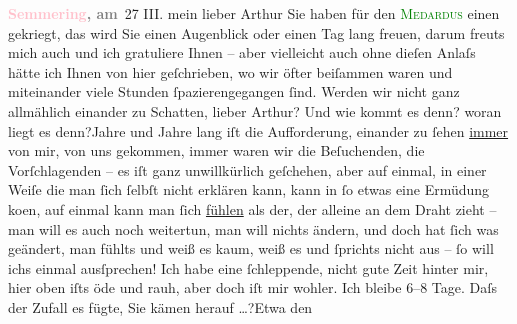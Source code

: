            \pstart
           \noindent{}\raggedleft{}\textcolor{gray}{\textbf{\textcolor{pink}{Semmering}{}\ledrightnote{\textcolor{pink}{Semmering}}, am}} 27 III.\pend
           \pstart{}mein lieber Arthur \pend\pstart
           Sie haben für den \textcolor{green}{\textsc{Medardus}}{}\ledrightnote{\textcolor{green}{Der junge Medardus. Dramatische Historie in einem Vorspiel und fünf Aufzügen}} einen \label{K_L02167_1v}\label{K_L02167_1h} gekriegt, das wird Sie einen Augenblick oder einen Tag lang
               freuen, darum freuts mich auch und ich gratuliere Ihnen – aber vielleicht auch ohne
               dieſen Anlaſs {\pb}hätte ich Ihnen von
               hier geſchrieben, wo wir öfter beiſammen waren und miteinander viele Stunden
               ſpazierengegangen ſind.\pend
           \pstart
           Werden wir nicht ganz allmählich einander zu Schatten, lieber Arthur?\pend
           \pstart
           Und wie kommt es denn? woran liegt es denn?\hspace*{1.5em}Jahre
               und Jahre lang iſt die Aufforderung, einander zu ſehen \uline{immer} von mir, von uns gekommen, immer waren wir die Beſuchenden, die
               Vorſchlagenden – es iſt ganz unwillkürlich {\pb}geſchehen, aber auf einmal, in
               einer Weiſe die man ſich ſelbſt nicht erklären kann, kann in ſo etwas eine Ermüdung
                  ko{\geminationm}en, auf einmal kann man ſich \uline{fühlen} als der, der alleine an dem Draht zieht – man will es
               auch noch weitertun, man will nichts ändern, und doch hat ſich was geändert, man
               fühlts und weiß es kaum, weiß es und ſprichts nicht aus – {\pb}ſo will ichs einmal
               ausſprechen!\pend
           \pstart
           Ich habe eine ſchleppende, nicht gute Zeit hinter mir, hier oben iſts öde und rauh,
               aber doch iſt mir wohler.\pend
           \pstart
           Ich bleibe \label{K_L02167_2v}\label{K_L02167_2h} 6–8 Tage. Daſs der Zufall es fügte, Sie kämen
               herauf {\dots}?\hspace*{1.5em}Etwa den
